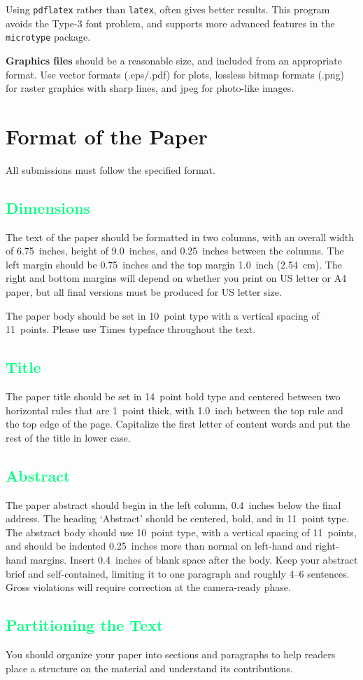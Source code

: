 \documentclass{article}
\newcommand{\csection}[1]{\section{\textcolor{imperialblue}{#1}}}
\newcommand{\csubsection}[1]{\subsection{\textcolor{springgreen}{#1}}}
\begin{document}
Using \texttt{pdflatex} rather than \texttt{latex}, often gives better
results. This program avoids the Type-3 font problem, and supports more
advanced features in the \texttt{microtype} package.

\textbf{Graphics files} should be a reasonable size, and included from
an appropriate format. Use vector formats (.eps/.pdf) for plots,
lossless bitmap formats (.png) for raster graphics with sharp lines, and
jpeg for photo-like images.

\csection{Format of the Paper}

All submissions must follow the specified format.

\csubsection{Dimensions}

The text of the paper should be formatted in two columns, with an
overall width of 6.75~inches, height of 9.0~inches, and 0.25~inches
between the columns. The left margin should be 0.75~inches and the top
margin 1.0~inch (2.54~cm). The right and bottom margins will depend on
whether you print on US letter or A4 paper, but all final versions
must be produced for US letter size.

The paper body should be set in 10~point type with a vertical spacing
of 11~points. Please use Times typeface throughout the text.

\csubsection{Title}

The paper title should be set in 14~point bold type and centered
between two horizontal rules that are 1~point thick, with 1.0~inch
between the top rule and the top edge of the page. Capitalize the
first letter of content words and put the rest of the title in lower
case.

\csubsection{Abstract}

The paper abstract should begin in the left column, 0.4~inches below the final
address. The heading `Abstract' should be centered, bold, and in 11~point type.
The abstract body should use 10~point type, with a vertical spacing of
11~points, and should be indented 0.25~inches more than normal on left-hand and
right-hand margins. Insert 0.4~inches of blank space after the body. Keep your
abstract brief and self-contained, limiting it to one paragraph and roughly 4--6
sentences. Gross violations will require correction at the camera-ready phase.

\csubsection{Partitioning the Text}

You should organize your paper into sections and paragraphs to help
readers place a structure on the material and understand its
contributions.
\end{document}
